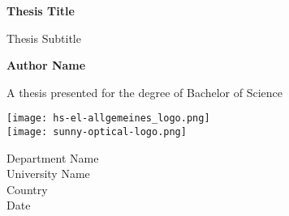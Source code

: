 \begin{titlepage}
	\begin{center}
		\vspace*{1cm}
		\Huge
		\textbf{Thesis Title}
		
		\vspace{0.5cm}
		\LARGE
		Thesis Subtitle
		\vspace{0.5cm}
		
		\textbf{Author Name}
		
		\vfill 
		A thesis presented for the degree of Bachelor of Science
		
		\vspace{0.8cm}
		\texttt{[image: hs-el-allgemeines\_logo.png]}
		\\
		\texttt{[image: sunny-optical-logo.png]}
		
		\Large
		Department Name\\
		University Name\\
		Country \\
		Date\\
		
	\end{center}
\end{titlepage}
